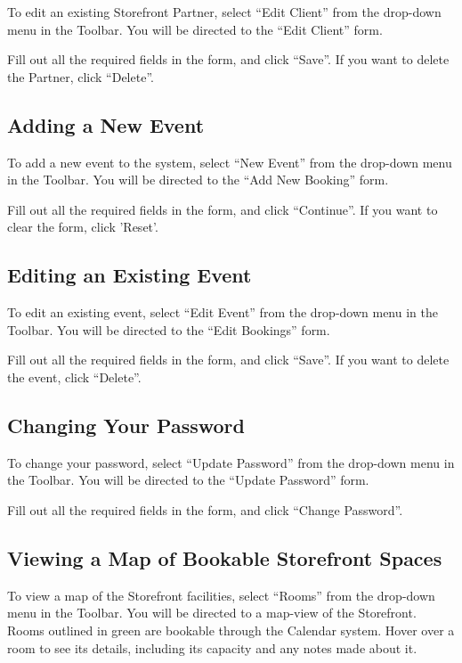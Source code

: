 To edit an existing Storefront Partner, select ``Edit Client'' from the drop-down menu in the Toolbar. You will be directed to the ``Edit Client'' form.

Fill out all the required fields in the form, and click ``Save''. If you want to delete the Partner, click ``Delete''.


\subsection{Adding a New Event}

To add a new event to the system, select ``New Event'' from the drop-down menu in the Toolbar. You will be directed to the ``Add New Booking'' form.

Fill out all the required fields in the form, and click ``Continue''. If you want to clear the form, click 'Reset'.


\subsection{Editing an Existing Event}

To edit an existing event, select ``Edit Event'' from the drop-down menu in the Toolbar. You will be directed to the ``Edit Bookings'' form.

Fill out all the required fields in the form, and click ``Save''. If you want to delete the event, click ``Delete''.


\subsection{Changing Your Password}

To change your password, select ``Update Password'' from the drop-down menu in the Toolbar. You will be directed to the ``Update Password'' form.

Fill out all the required fields in the form, and click ``Change Password''.


\subsection{Viewing a Map of Bookable Storefront Spaces}

To view a map of the Storefront facilities, select ``Rooms'' from the drop-down menu in the Toolbar. You will be directed to a map-view of the Storefront. Rooms outlined in green are bookable through the Calendar system. Hover over a room to see its details, including its capacity and any notes made about it.



